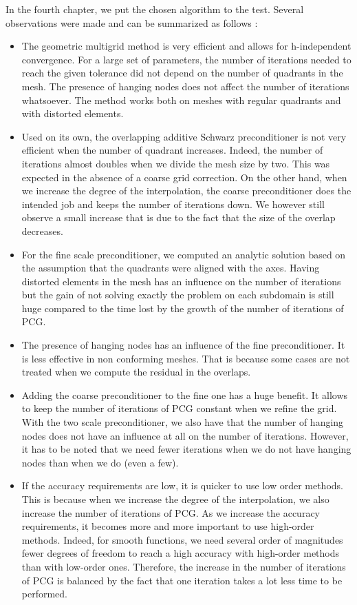 In the fourth chapter, we put the chosen algorithm to the test. Several observations were made and can be summarized as follows : 

\begin{itemize}
\item The geometric multigrid method is very efficient and allows for h-independent convergence. For a large set of parameters, the number of iterations needed to reach the given tolerance did not depend on the number of quadrants in the mesh. The presence of hanging nodes does not affect the number of iterations whatsoever. The method works both on meshes with regular quadrants and with distorted elements. 
\item Used on its own, the overlapping additive Schwarz preconditioner is not very efficient when the number of quadrant increases. Indeed, the number of iterations almost doubles when we divide the mesh size by two. This was expected in the absence of a coarse grid correction. On the other hand, when we increase the degree of the interpolation, the coarse preconditioner does the intended job and keeps the number of iterations down. We however still observe a small increase that is due to the fact that the size of the overlap decreases.
\item For the fine scale preconditioner, we computed an analytic solution based on the assumption that the quadrants were aligned with the axes. Having distorted elements in the mesh has an influence on the number of iterations but the gain of not solving exactly the problem on each subdomain is still huge compared to the time lost by the growth of the number of iterations of PCG.
\item The presence of hanging nodes has an influence of the fine preconditioner. It is less effective in non conforming meshes. That is because some cases are not treated when we compute the residual in the overlaps. 
\item Adding the coarse preconditioner to the fine one has a huge benefit. It allows to keep the number of iterations of PCG constant when we refine the grid. With the two scale preconditioner, we also have that the number of hanging nodes does not have an influence at all on the number of iterations. However, it has to be noted that we need fewer iterations when we do not have hanging nodes than when we do (even a few). 
\item If the accuracy requirements are low, it is quicker to use low order methods. This is because when we increase the degree of the interpolation, we also increase the number of iterations of PCG. As we increase the accuracy requirements, it becomes more and more important to use high-order methods. Indeed, for smooth functions, we need several order of magnitudes fewer degrees of freedom to reach a high accuracy with high-order methods than with low-order ones. Therefore, the increase in the number of iterations of PCG is balanced by the fact that one iteration takes a lot less time to be performed. 
\end{itemize}

